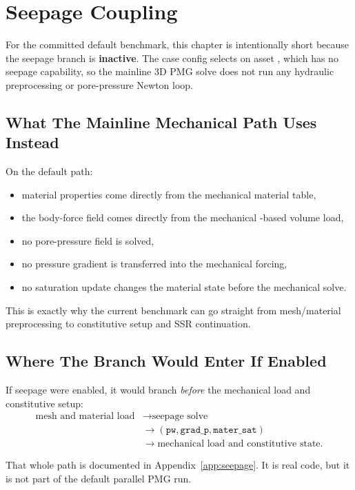 \chapter{Seepage Coupling}

For the committed default benchmark, this chapter is intentionally short because
the seepage branch is \textbf{inactive}. The case config selects
 on asset , which has no seepage
capability, so the mainline 3D PMG solve does not run any hydraulic
preprocessing or pore-pressure Newton loop.

\section{What The Mainline Mechanical Path Uses Instead}

On the default path:
\begin{itemize}
\item material properties come directly from the mechanical material table,
\item the body-force field comes directly from the mechanical
-based volume load,
\item no pore-pressure field  is solved,
\item no pressure gradient  is transferred into the mechanical
forcing,
\item no saturation update changes the material state before the mechanical
solve.
\end{itemize}

This is exactly why the current benchmark can go straight from mesh/material
preprocessing to constitutive setup and SSR continuation.

\section{Where The Branch Would Enter If Enabled}

If seepage were enabled, it would branch \emph{before} the mechanical load and
constitutive setup:
\[
\begin{aligned}
\text{mesh and material load} &\rightarrow \text{seepage solve} \\
&\rightarrow (\texttt{pw}, \texttt{grad\_p}, \texttt{mater\_sat}) \\
&\rightarrow \text{mechanical load and constitutive state}.
\end{aligned}
\]

That whole path is documented in Appendix~\ref{app:seepage}. It is real code,
but it is not part of the default parallel PMG run.

